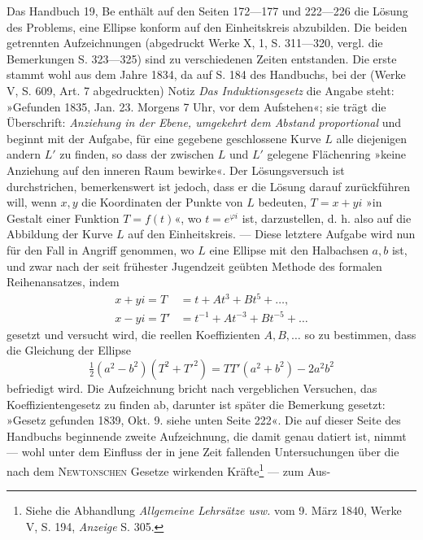 \par\clearpage{}
\begin{center}\end{center}
\noindent\hspace*{\parindent}Das Handbuch 19, Be enthält auf den Seiten 172—177 und 222—226
die Lösung des Problems, eine Ellipse konform auf den Einheitskreis abzubilden.
Die beiden getrennten Aufzeichnungen (abgedruckt Werke X, 1,
S. 311—320, vergl. die Bemerkungen S. 323—325) sind zu verschiedenen
Zeiten entstanden. Die erste stammt wohl aus dem Jahre 1834, da auf S. 184
des Handbuchs, bei der (Werke V, S. 609, Art. 7 abgedruckten) Notiz \textit{Das
Induktionsgesetz} die Angabe steht: »Gefunden 1835, Jan. 23. Morgens 7 Uhr,
vor dem Aufstehen«; sie trägt die Überschrift: \textit{Anziehung in der Ebene, umgekehrt
dem Abstand proportional} und beginnt mit der Aufgabe, für eine
gegebene geschlossene Kurve \(L\) alle diejenigen andern \(L'\) zu finden, so dass
der zwischen \(L\) und \(L'\) gelegene Flächenring »keine Anziehung auf den
inneren Raum bewirke«. Der Lösungsversuch ist durchstrichen, bemerkenswert
ist jedoch, dass er die Lösung darauf zurückführen will, wenn \(x,y\) die
Koordinaten der Punkte von \(L\) bedeuten, \(T=x+yi\) »in Gestalt einer Funktion
\(T=f(t)\)«, wo \(t=e^{\varphi i}\) ist, darzustellen, d. h. also auf die Abbildung der
Kurve \(L\) auf den Einheitskreis. — Diese letztere Aufgabe wird nun für den
Fall in Angriff genommen, wo \(L\) eine Ellipse mit den Halbachsen \(a,b\) ist,
und zwar nach der seit frühester Jugendzeit geübten Methode des formalen
Reihenansatzes, indem
\[
\begin{aligned}
x+yi=T&=t+At^3+Bt^5+\ldots,\\
x-yi=T'&=t^{-1}+At^{-3}+Bt^{-5}+\ldots
\end{aligned}
\]
gesetzt und versucht wird, die reellen Koeffizienten \(A,B,\ldots\) so zu bestimmen,
dass die Gleichung der Ellipse
\[
\tfrac12(a^2-b^2)(T^2+T'^2)=TT'(a^2+b^2)-2a^2b^2
\]
befriedigt wird. Die Aufzeichnung bricht nach vergeblichen Versuchen, das
Koeffizientengesetz zu finden ab, darunter ist später die Bemerkung gesetzt:
»Gesetz gefunden 1839, Okt. 9. siehe unten Seite 222«. Die auf dieser Seite
des Handbuchs beginnende zweite Aufzeichnung, die damit genau datiert ist,
nimmt — wohl unter dem Einfluss der in jene Zeit fallenden Untersuchungen
über die nach dem \textsc{Newtonschen} Gesetze wirkenden Kräfte\footnote{Siehe die Abhandlung \textit{Allgemeine Lehrsätze usw.} vom 9. März 1840, Werke V, S. 194, \textit{Anzeige} S. 305.} — zum Aus-\par
